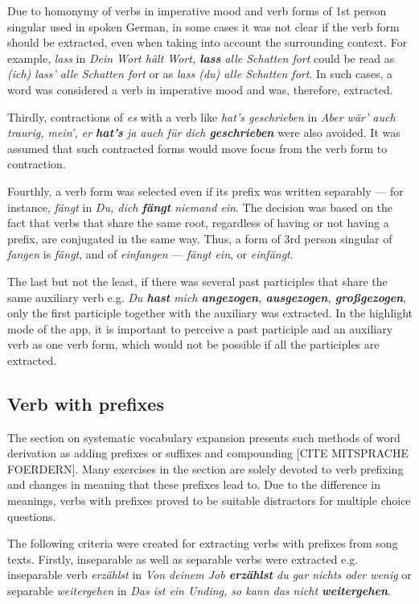 Due to homonymy of verbs in imperative mood and verb forms of 1st person singular used in spoken German, in some cases it was not clear if the verb form should be extracted, even when taking into account the surrounding context. For example, \textit{lass} in \textit{Dein Wort hält Wort, \textbf{lass} alle Schatten fort} could be read as \textit{(ich) lass' alle Schatten fort} or as \textit{lass (du) alle Schatten fort}. In such cases, a word was considered a verb in imperative mood and was, therefore, extracted.

Thirdly, contractions of \textit{es} with a verb like \textit{hat's geschrieben} in \textit{Aber wär' auch traurig, mein', er \textbf{hat's} ja auch für dich \textbf{geschrieben}} were also avoided. It was assumed that such contracted forms would move focus from the verb form to contraction.

Fourthly, a verb form was selected even if its prefix was written separably --- for instance, \textit{fängt} in \textit{Du, dich \textbf{fängt} niemand ein}. The decision was based on the fact that verbs that share the same root, regardless of having or not having a prefix, are conjugated in the same way. Thus, a form of 3rd person singular of \textit{fangen} is \textit{fängt}, and of \textit{einfangen} --- \textit{fängt ein}, or \textit{einfängt}.

The last but not the least, if there was several past participles that share the same auxiliary verb e.g. \textit{Du \textbf{hast} mich \textbf{angezogen}, \textbf{ausgezogen}, \textbf{großgezogen}}, only the first participle together with the auxiliary was extracted. In the highlight mode of the app, it is important to perceive a past participle and an auxiliary verb as one verb form, which would not be possible if all the participles are extracted.

\subsection{Verb with prefixes}

The section on systematic vocabulary expansion presents such methods of word derivation as adding prefixes or suffixes and compounding [CITE MITSPRACHE FOERDERN]. Many exercises in the section are solely devoted to verb prefixing and changes in meaning that these prefixes lead to. Due to the difference in meanings, verbs with prefixes proved to be suitable distractors for multiple choice questions.

The following criteria were created for extracting verbs with prefixes from song texts. Firstly, inseparable as well as separable verbs were extracted e.g. inseparable verb \textit{erzählst} in \textit{Von deinem Job \textbf{erzählst} du gar nichts oder wenig} or separable \textit{weitergehen} in \textit{Das ist ein Unding, so kann das nicht \textbf{weitergehen}}.

